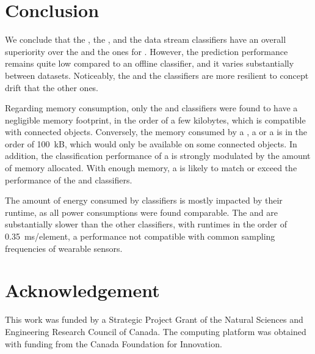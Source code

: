 \section{Conclusion}

We conclude that the \hoeffdingtree, the \mondrianforest, and the
\naivebayes data stream classifiers have an overall superiority over the
\FNN and the \mcnns ones for \har.  However, the prediction performance
remains quite low compared to an offline \knn classifier, and it varies
substantially between datasets. Noticeably, the \hoeffdingtree and the
\mcnns classifiers are more resilient to concept drift that the other ones.

Regarding memory consumption, only the \mcnn and \naivebayes classifiers
were found to have a negligible memory footprint, in the order of a few
kilobytes, which is compatible with connected objects. Conversely, the
memory consumed by a \mondrianforest, a \FNN or a \hoeffdingtree is in the
order of 100~kB, which would only be available on some connected objects.
In addition, the classification performance of a \mondrianforest is
strongly modulated by the amount of memory allocated. With enough memory, a
\mondrianforest is likely to match or exceed the performance of the
\hoeffdingtree and \naivebayes classifiers.

The amount of energy consumed by classifiers is mostly impacted by their
runtime, as all power consumptions were found comparable. The
\hoeffdingtree and \mondrianforest are substantially slower than the other
classifiers, with runtimes in the order of 0.35~ms/element, a performance not compatible 
with common sampling frequencies of wearable sensors. 



\section*{Acknowledgement}
This work was funded by a Strategic Project Grant of the Natural Sciences
and Engineering Research Council of Canada. The computing platform was
obtained with funding from the Canada Foundation for Innovation.

